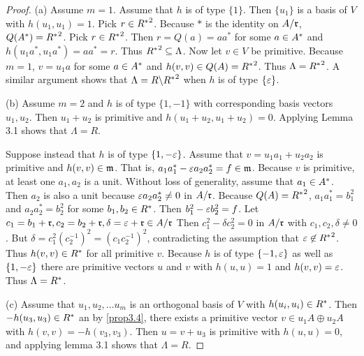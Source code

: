 \begin{proof}
(a) Assume $m=1$.
Assume that $h$ is of type $\{1\}$.
Then $\{u_1\}$ is a basis of $V$ with $h(u_1, u_1) = 1$. Pick $r \in {R^*}^2$. Because $*$ is the identity on $A / \mathfrak{r}$, $Q(A^*) = {R^*}^2$.
Pick $r \in {R^*}^2$.
Then $r = Q(a) = a a^*$ for some $a \in A^*$ and $h(u_1 a^*, u_1 a^*) = aa^* = r$.
Thus ${R^*}^2 \subseteq \Lambda$.
Now let $v \in V$ be primitive.
Because $m=1$, $v = u_1 a$ for some $a \in A^*$ and $h(v, v) \in Q(A) = {R^*}^2$.
Thus $\Lambda = {R^*}^2$.
A similar argument shows that $\Lambda = R \backslash {R^*}^2$ when $h$ is of type $\{\varepsilon\}$.

(b) Assume $m = 2$ and $h$ is of type $\{1, -1\}$ with corresponding basis vectors $u_1, u_2$.
Then $u_1 + u_2$ is primitive and $h(u_1 + u_2, u_1 + u_2) = 0$.
Applying Lemma 3.1 shows that $\Lambda = R$.

Suppose instead that $h$ is of type $\{1, -\varepsilon\}$.
Assume that $v = u_1 a_1 + u_2 a_2$ is primitive and $h(v,v) \in \mathfrak{m}$.
That is, $a_1 a_1^* - \varepsilon a_2 a_2^* = f \in \mathfrak{m}$.
Because $v$ is primitive, at least one $a_1, a_2$ is a unit.
Without loss of generality, assume that $a_1 \in A^*$.
Then $a_2$ is also a unit because $\varepsilon a_2 a_2^* \ne 0$ in $A / \mathfrak{r}$.
Because $Q(A) = {R^*}^2$, $a_1 a_1^* = b_1^2$ and $a_2 a_2^* = b_2^2$ for some $b_1, b_2 \in R^*$. 
Then $b_1^2 - \varepsilon b_2^2 = f$. 
Let $c_1 = b_1 + \mathfrak{r}, c_2 = b_2 + \mathfrak{r}, \delta = \varepsilon + \mathfrak{r} \in A/\mathfrak{r}$
Then $c_1^2 - \delta c_2^2 = 0$ in $A / \mathfrak{r}$ with $c_1, c_2, \delta \ne 0$.
But $\delta = c_1^2 (c_2^{-1})^2 = (c_1 c_2^{-1})^2$, contradicting the assumption that $\varepsilon \not\in {R^*}^2$.
Thus $h(v,v) \in R^*$ for all primitive $v$.
Because $h$ is of type $\{-1, \varepsilon \}$ as well as $\{1, -\varepsilon\}$ there are primitive vectors $u$ and $v$ with $h(u,u) = 1$ and $h(v,v) = \varepsilon$.
Thus $\Lambda = R^*$.

(c) Assume that $u_1, u_2, \dotsc u_m$ is an orthogonal basis of $V$ with $h(u_i, u_i) \in R^*$.
Then $-h(u_3, u_3) \in R^*$ an by \cref{prop3.4}, there exists a primitive vector $v \in u_1 A \oplus u_2 A$ with $h(v,v) = -h(v_3, v_3)$.
Then $u = v + u_3$ is primitive with $h(u,u) = 0$, and applying lemma 3.1 shows that $\Lambda = R$.
\end{proof}

